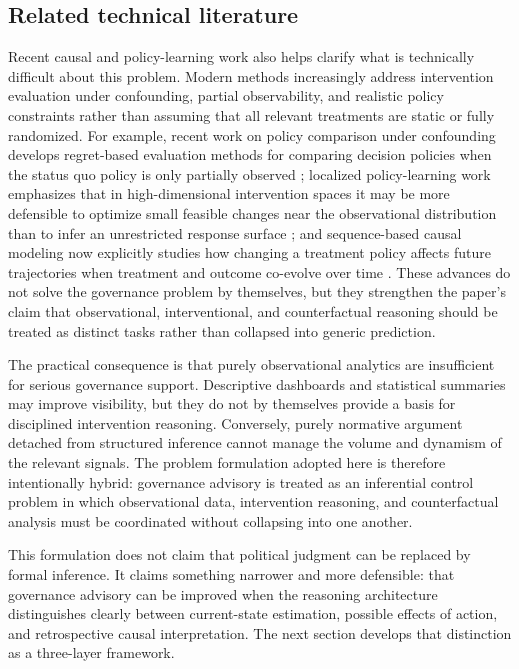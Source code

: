 \documentclass[11pt]{article}
\begin{document}
\subsection*{Related technical literature}

Recent causal and policy-learning work also helps clarify what is technically difficult about this problem. Modern methods increasingly address intervention evaluation under confounding, partial observability, and realistic policy constraints rather than assuming that all relevant treatments are static or fully randomized. For example, recent work on policy comparison under confounding develops regret-based evaluation methods for comparing decision policies when the status quo policy is only partially observed \citep{guerdan2024predictive}; localized policy-learning work emphasizes that in high-dimensional intervention spaces it may be more defensible to optimize small feasible changes near the observational distribution than to infer an unrestricted response surface \citep{marmarelis2024policy}; and sequence-based causal modeling now explicitly studies how changing a treatment policy affects future trajectories when treatment and outcome co-evolve over time \citep{hizli2023causal}. These advances do not solve the governance problem by themselves, but they strengthen the paper's claim that observational, interventional, and counterfactual reasoning should be treated as distinct tasks rather than collapsed into generic prediction.

The practical consequence is that purely observational analytics are insufficient for serious governance support. Descriptive dashboards and statistical summaries may improve visibility, but they do not by themselves provide a basis for disciplined intervention reasoning. Conversely, purely normative argument detached from structured inference cannot manage the volume and dynamism of the relevant signals. The problem formulation adopted here is therefore intentionally hybrid: governance advisory is treated as an inferential control problem in which observational data, intervention reasoning, and counterfactual analysis must be coordinated without collapsing into one another.

This formulation does not claim that political judgment can be replaced by formal inference. It claims something narrower and more defensible: that governance advisory can be improved when the reasoning architecture distinguishes clearly between current-state estimation, possible effects of action, and retrospective causal interpretation. The next section develops that distinction as a three-layer framework.
\end{document}
